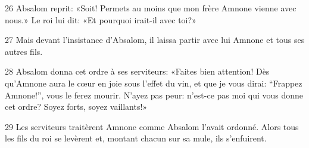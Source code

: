 
26 Absalom reprit: «Soit! Permets au moins que mon frère Amnone vienne avec nous.» Le roi lui dit: «Et pourquoi irait-il avec toi?»

27 Mais devant l’insistance d’Absalom, il laissa partir avec lui Amnone et tous ses autres fils.

28 Absalom donna cet ordre à ses serviteurs: «Faites bien attention! Dès qu’Amnone aura le cœur en joie sous l’effet du vin, et que je vous dirai: “Frappez Amnone!”, vous le ferez mourir. N’ayez pas peur: n’est-ce pas moi qui vous donne cet ordre? Soyez forts, soyez vaillants!»

29 Les serviteurs traitèrent Amnone comme Absalom l’avait ordonné. Alors tous les fils du roi se levèrent et, montant chacun sur sa mule, ils s’enfuirent.
